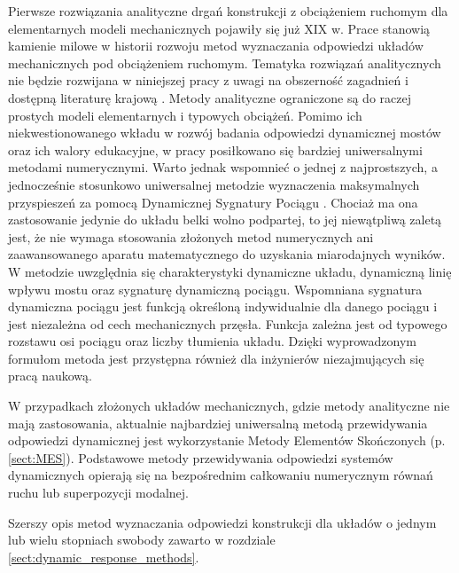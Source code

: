 Pierwsze rozwiązania analityczne drgań konstrukcji z obciążeniem ruchomym dla elementarnych modeli mechanicznych pojawiły się już XIX w. Prace \parencite{Willis1849,Stokes1849,Saller1921,Timoshenko1922,Inglis1934,Kolousek1973} stanowią kamienie milowe w historii rozwoju metod wyznaczania odpowiedzi układów mechanicznych pod obciążeniem ruchomym. Tematyka rozwiązań analitycznych nie będzie rozwijana w niniejszej pracy z uwagi na obszerność zagadnień i dostępną literaturę krajową \parencite{Szczesniak2018}. Metody analityczne ograniczone są do raczej prostych modeli elementarnych i typowych obciążeń. Pomimo ich niekwestionowanego wkładu w rozwój badania odpowiedzi dynamicznej mostów oraz ich walory edukacyjne, w pracy posiłkowano się bardziej uniwersalnymi metodami numerycznymi. Warto jednak wspomnieć o jednej z najprostszych, a jednocześnie stosunkowo uniwersalnej metodzie wyznaczenia maksymalnych przyspieszeń za pomocą Dynamicznej Sygnatury Pociągu  \parencite{Goicolea2008a,ERRI1998}. Chociaż ma ona zastosowanie jedynie do układu belki wolno podpartej, to jej niewątpliwą zaletą jest, że nie wymaga stosowania złożonych metod numerycznych ani zaawansowanego aparatu matematycznego do uzyskania miarodajnych wyników. W metodzie uwzględnia się charakterystyki dynamiczne układu, dynamiczną linię wpływu mostu  oraz sygnaturę dynamiczną pociągu. Wspomniana sygnatura dynamiczna pociągu jest funkcją określoną indywidualnie dla danego pociągu i jest niezależna od cech mechanicznych przęsła. Funkcja zależna jest od typowego rozstawu osi pociągu oraz liczby tłumienia układu. Dzięki wyprowadzonym formułom metoda jest przystępna również dla inżynierów niezajmujących się pracą naukową.

W przypadkach złożonych układów mechanicznych, gdzie metody analityczne nie mają zastosowania, aktualnie najbardziej uniwersalną metodą przewidywania odpowiedzi dynamicznej jest wykorzystanie Metody Elementów Skończonych (p. \ref{sect:MES}). Podstawowe metody przewidywania odpowiedzi systemów dynamicznych opierają się na bezpośrednim całkowaniu numerycznym równań ruchu lub superpozycji modalnej. 

Szerszy opis metod wyznaczania odpowiedzi konstrukcji dla układów o jednym lub wielu stopniach swobody zawarto w rozdziale \ref{sect:dynamic_response_methods}.


